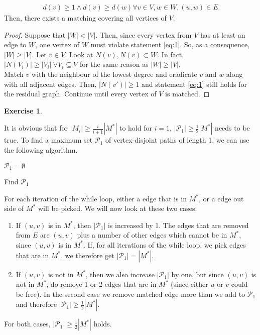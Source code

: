 \documentclass[a4paper,12pt,headsepline]{scrartcl}
\newtheorem{aufgabe}{Exercise}
\begin{document}
\begin{enumerate}
	\begin{align}
		d(v) \geq 1 \wedge d(v) \geq d(w) \forall v\in V, w\in W, (u,w) \in E\label{eq:1}
	\end{align}
	Then, there exists a matching covering all vertices of $V$.
	\begin{proof}
		Suppose that $|W| < |V|$. Then, since every vertex from $V$ has at least an edge to $W$, one vertex of $W$ must violate statement \ref{eq:1}. So, as a consequence, $|W| \geq |V|$. Let $v\in V$. Look at $N(v),N(v) \subset W$. In fact, $|N(V_i)| \geq |V_i|~ \forall V_i \subseteq V$ for the same reason as $|W| \geq|V|$.\\
		Match $v$ with the neighbour of the lowest degree and eradicate $v$ and $w$ along with all adjacent edges. Then, $|N(v')| \geq 1$ and statement \ref{eq:1} still holds for the residual graph. Continue until every vertex of $V$ is matched. 
	
	\end{proof}
\end{enumerate}
\newpage
\begin{aufgabe}
\end{aufgabe}

It is obvious that for $|M_i|\ge \frac{i}{i+1}|M^*|$ to hold for $i=1$, $|\mathcal P_1|\ge \frac 12 |M^*|$ needs to be true.
To find a maximum set $\mathcal P_1$ of vertex-disjoint paths of length 1, we can use the following algorithm.

\begin{algorithm}[H]
\SetAlgoLined
{}
$\mathcal P_1=\emptyset$\;
\caption{Find $\mathcal P_1$}
\end{algorithm}

For each iteration of the while loop, either a edge that is in $M^*$, or a edge out side of $M^*$ will be picked.
We will now look at these two cases:
\begin{enumerate}
 \item If $(u,v)$ is in $M^*$, then $|\mathcal P_1|$ is increased by 1.
     The edges that are removed from $E$ are $(u,v)$ plus a number of other edges which cannot be in $M^*$, since $(u,v)$ is in $M^*$.
     If, for all iterations of the while loop, we pick edges that are in $M^*$, we therefore get $|\mathcal P_1|=|M^*|$.
 \item If $(u,v)$ is not in $M^*$, then we also increase $|\mathcal P_1|$ by one, but since $(u,v)$ is not in $M^*$, do remove 1 or 2 edges that are in $M^*$ (since either $u$ or $v$ could be free).
     In the second case we remove matched edge more than we add to $\mathcal P_1$ and therefore $|\mathcal P_1|\ge \frac 12 |M^*|$.
\end{enumerate}
For both cases, $|\mathcal P_1|\ge \frac 12 |M^*|$ holds.
\end{document}
